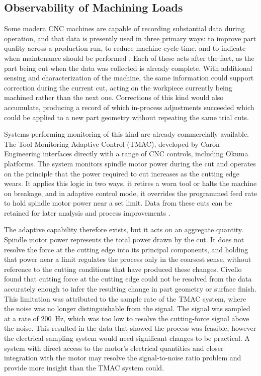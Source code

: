 \subsection{Observability of Machining Loads}\label{observability}
Some modern CNC machines are capable of recording substantial data during operation, and that data is presently used in three primary ways: to improve part quality across a production run, to reduce machine cycle time, and to indicate when maintenance should be performed \cite{tao_data-driven_2018,teti_advanced_2010}. Each of these acts after the fact, as the part being cut when the data was collected is already complete. With additional sensing and characterization of the machine, the same information could support correction during the current cut, acting on the workpiece currently being machined rather than the next one. Corrections of this kind would also accumulate, producing a record of which in-process adjustments succeeded which could be applied to a new part geometry without repeating the same trial cuts.

Systems performing monitoring of this kind are already commercially available. The Tool Monitoring Adaptive Control (TMAC), developed by Caron Engineering interfaces directly with a range of CNC controls, including Okuma platforms. The system monitors spindle motor power during the cut and operates on the principle that the power required to cut increases as the cutting edge wears. It applies this logic in two ways, it retires a worn tool or halts the machine on breakage, and in adaptive control mode, it overrides the programmed feed rate to hold spindle motor power near a set limit. Data from these cuts can be retained for later analysis and process improvements \cite{caron_tmac,cte_tmac_2020,okuma_caron, civiello_characterization_2026}.

The adaptive capability therefore exists, but it acts on an aggregate quantity. Spindle motor power represents the total power drawn by the cut. It does not resolve the force at the cutting edge into its principal components, and holding that power near a limit regulates the process only in the coarsest sense, without reference to the cutting conditions that have produced these changes. Civello \cite{civiello_characterization_2026} found that cutting force at the cutting edge could not be resolved from the data accurately enough to infer the resulting change in part geometry or surface finish. This limitation was attributed to the sample rate of the TMAC system, where the noise was no longer distinguishable from the signal. The signal was sampled at a rate of \SI{200}{\hertz}, which was too low to resolve the cutting-force signal above the noise. This resulted in the data that showed the process was feasible, however the electrical sampling system would need significant changes to be practical. A system with direct access to the motor’s electrical quantities and closer integration with the motor may resolve the signal-to-noise ratio problem and provide more insight than the TMAC system could. 


